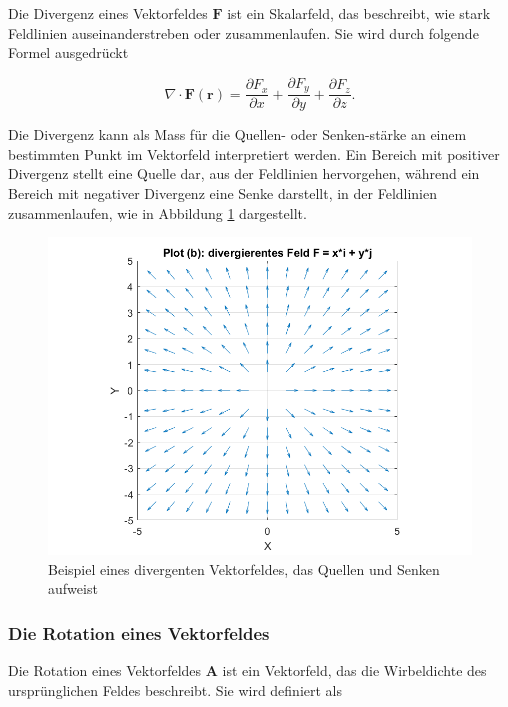 Die Divergenz eines Vektorfeldes $\mathbf{F}$ ist ein Skalarfeld, das beschreibt, wie stark Feldlinien auseinanderstreben oder zusammenlaufen. Sie wird durch folgende Formel ausgedrückt

\begin{equation}
\nabla \cdot \mathbf{F}(\mathbf{r}) = \frac{\partial F_x}{\partial x} + \frac{\partial F_y}{\partial y} + \frac{\partial F_z}{\partial z}.
\end{equation}

\noindent Die Divergenz kann als Mass für die Quellen- oder Senken-stärke an einem bestimmten Punkt im Vektorfeld interpretiert werden. Ein Bereich mit positiver Divergenz stellt eine Quelle dar, aus der Feldlinien hervorgehen, während ein Bereich mit negativer Divergenz eine Senke darstellt, in der Feldlinien zusammenlaufen, wie in Abbildung \ref{fig:DivergenzAlg} dargestellt.

\begin{figure}[h!]
    \centering
    \includegraphics[scale=0.4]{papers/helmholtz/images/divergentes_Feld.png}
    \caption{Beispiel eines divergenten Vektorfeldes, das Quellen und Senken aufweist}
    \label{fig:DivergenzAlg}
\end{figure}

\subsubsection{Die Rotation eines Vektorfeldes}

Die Rotation eines Vektorfeldes $\mathbf{A}$ ist ein Vektorfeld, das die Wirbeldichte des ursprünglichen Feldes beschreibt. Sie wird definiert als


